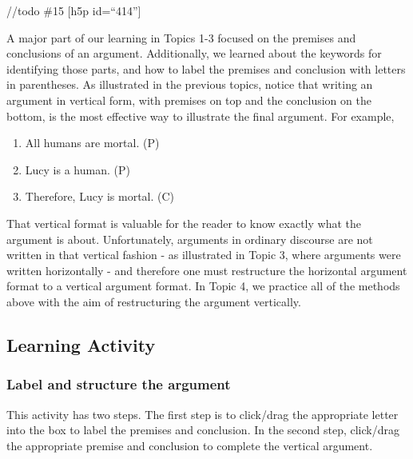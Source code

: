 \documentclass[
]{book}
\providecommand{\tightlist}{%
  \setlength{\itemsep}{0pt}\setlength{\parskip}{0pt}}
\begin{document}
//todo \#15
{[}h5p id=``414''{]}

A major part of our learning in Topics 1-3 focused on the premises and conclusions of an argument. Additionally, we learned about the keywords for identifying those parts, and how to label the premises and conclusion with letters in parentheses. As illustrated in the previous topics, notice that writing an argument in vertical form, with premises on top and the conclusion on the bottom, is the most effective way to illustrate the final argument. For example,

\begin{enumerate}
\def\labelenumi{\arabic{enumi}.}
\tightlist
\item
  All humans are mortal. (P)\\
\item
  Lucy is a human. (P)\\
\item
  Therefore, Lucy is mortal. (C)
\end{enumerate}

That vertical format is valuable for the reader to know exactly what the argument is about. Unfortunately, arguments in ordinary discourse are not written in that vertical fashion - as illustrated in Topic 3, where arguments were written horizontally - and therefore one must restructure the horizontal argument format to a vertical argument format. In Topic 4, we practice all of the methods above with the aim of restructuring the argument vertically.

\hypertarget{learning-activity-2}{%
\subsection*{Learning Activity}\label{learning-activity-2}}

\hypertarget{label-and-structure-the-argument}{%
\subsubsection*{Label and structure the argument}\label{label-and-structure-the-argument}}

This activity has two steps. The first step is to click/drag the appropriate letter into the box to label the premises and conclusion. In the second step, click/drag the appropriate premise and conclusion to complete the vertical argument.
\end{document}
